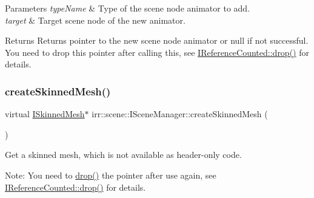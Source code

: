\begin{DoxyParams}{Parameters}
{\em type\+Name} & Type of the scene node animator to add. \\
\hline
{\em target} & Target scene node of the new animator. \\
\hline
\end{DoxyParams}
\begin{DoxyReturn}{Returns}
Returns pointer to the new scene node animator or null if not successful. You need to drop this pointer after calling this, see \hyperlink{classirr_1_1IReferenceCounted_a03856a09355b89d178090c4a5f738543}{I\+Reference\+Counted\+::drop()} for details. 
\end{DoxyReturn}
\mbox{\label{classirr_1_1scene_1_1ISceneManager_a67015b46ffde252ba723e6dcc6a93ac2}} 
\subsubsection{\texorpdfstring{create\+Skinned\+Mesh()}{createSkinnedMesh()}}
{\footnotesize\ttfamily virtual \hyperlink{classirr_1_1scene_1_1ISkinnedMesh}{I\+Skinned\+Mesh}$\ast$ irr\+::scene\+::\+I\+Scene\+Manager\+::create\+Skinned\+Mesh (\begin{DoxyParamCaption}{ }\end{DoxyParamCaption})\hspace{0.3cm}{\ttfamily [pure virtual]}}



Get a skinned mesh, which is not available as header-\/only code. 

Note\+: You need to \hyperlink{classirr_1_1IReferenceCounted_a03856a09355b89d178090c4a5f738543}{drop()} the pointer after use again, see \hyperlink{classirr_1_1IReferenceCounted_a03856a09355b89d178090c4a5f738543}{I\+Reference\+Counted\+::drop()} for details. \mbox{\label{classirr_1_1scene_1_1ISceneManager_af52f8c74e08637b7643d239542371bc5}} 
